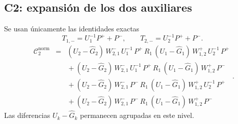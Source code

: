 \subsection*{C2: expansión de los dos auxiliares}
Se usan únicamente las identidades exactas
\[
T_{1,-}=U_1^{-1}P^+ +P^-,
\qquad
T_{2,-}=U_2^{-1}P^+ +P^-.
\]
\[
\begin{aligned}\mathcal C_{2}^{\mathrm{norm}} &={}& \left(U_{2} - \widehat G_{2}\right)\,W^-_{2,1}\,U_{1}^{-1}\,P^{+}\,R_{1}\,\left(U_{1} - \widehat G_{1}\right)\,W^+_{1,2}\,U_{2}^{-1}\,P^{+} \\ &&{}+ \left(U_{2} - \widehat G_{2}\right)\,W^-_{2,1}\,U_{1}^{-1}\,P^{+}\,R_{1}\,\left(U_{1} - \widehat G_{1}\right)\,W^+_{1,2}\,P^{-} \\ &&{}+ \left(U_{2} - \widehat G_{2}\right)\,W^-_{2,1}\,P^{-}\,R_{1}\,\left(U_{1} - \widehat G_{1}\right)\,W^+_{1,2}\,U_{2}^{-1}\,P^{+} \\ &&{}+ \left(U_{2} - \widehat G_{2}\right)\,W^-_{2,1}\,P^{-}\,R_{1}\,\left(U_{1} - \widehat G_{1}\right)\,W^+_{1,2}\,P^{-}\end{aligned}.
\]
Las diferencias $U_k-\widehat G_k$ permanecen agrupadas en este nivel.

